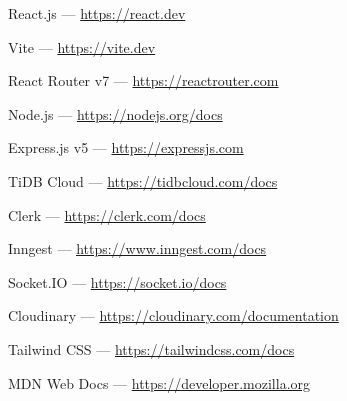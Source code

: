 \documentclass[12pt,a4paper]{report}
\begin{document}
\begin{enumerate}[label={[\arabic*]},leftmargin=2.5em,itemsep=2pt,start=8]
  \item React.js --- \url{https://react.dev} 
  \item Vite --- \url{https://vite.dev} 
  \item React Router v7 --- \url{https://reactrouter.com} 
  \item Node.js --- \url{https://nodejs.org/docs} 
  \item Express.js v5 --- \url{https://expressjs.com} 
  \item TiDB Cloud --- \url{https://tidbcloud.com/docs} 
  \item Clerk --- \url{https://clerk.com/docs} 
  \item Inngest --- \url{https://www.inngest.com/docs} 
  \item Socket.IO --- \url{https://socket.io/docs} 
  \item Cloudinary --- \url{https://cloudinary.com/documentation} 
  \item Tailwind CSS --- \url{https://tailwindcss.com/docs} 
  \item MDN Web Docs --- \url{https://developer.mozilla.org} 
\end{enumerate}
\end{document}
